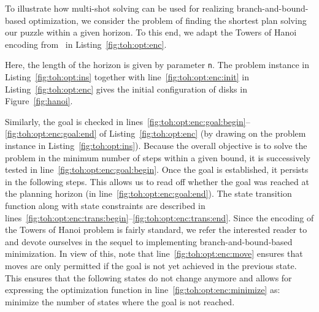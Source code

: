 To illustrate how multi-shot solving can be used for realizing branch-and-bound-based optimization,
we consider the problem of finding the shortest plan solving our puzzle within a given horizon.
%
To this end,
we adapt the Towers of Hanoi encoding from~\cite{gekakasc12a} in Listing~\ref{fig:toh:opt:enc}.

Here, the length of the horizon is given by parameter \texttt{n}.
%
The problem instance in Listing~\ref{fig:toh:opt:ins} together with line~\ref{fig:toh:opt:enc:init} in Listing~\ref{fig:toh:opt:enc} gives the initial
configuration of disks in Figure~\ref{fig:hanoi}.

%
Similarly,
the goal is checked in lines~\ref{fig:toh:opt:enc:goal:begin}--\ref{fig:toh:opt:enc:goal:end} of Listing~\ref{fig:toh:opt:enc} 
(by drawing on the problem instance in Listing~\ref{fig:toh:opt:ins}).
Because the overall objective is to solve the problem in the minimum number of steps within a given bound,
it is successively tested in line~\ref{fig:toh:opt:enc:goal:begin}.
Once the goal is established, it persists in the following steps.
This allows us to read off whether the goal was reached at the planning horizon (in line~\ref{fig:toh:opt:enc:goal:end}).
%
The state transition function along with state constraints are described in lines~\ref{fig:toh:opt:enc:trans:begin}--\ref{fig:toh:opt:enc:trans:end}.
Since the encoding of the Towers of Hanoi problem is fairly standard, we refer the interested reader to~\cite{gekakasc12a}
and devote ourselves in the sequel to implementing branch-and-bound-based minimization.
In view of this, note that line~\ref{fig:toh:opt:enc:move} ensures that moves are only permitted if the goal is not yet achieved in the previous state.
This ensures that the following states do not change anymore and allows for expressing the optimization function in line~\ref{fig:toh:opt:enc:minimize} as: minimize the number of states where the goal is not reached.

